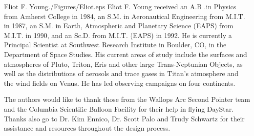 \documentclass[twocolumn,letterpaper]{IEEEAerospace2012}
\newcommand{\rootdir}{./Figures/}
\begin{document}
\begin{biographywithpic}{Eliot F. Young}{\rootdir Eliot.eps}
Eliot F. Young received an A.B .in Physics from Amherst College in 1984, an S.M. in Aeronautical Engineering from M.I.T. in 1987, an S.M. in Earth, Atmospheric and Planetary Science (EAPS) from M.I.T. in 1990, and an Sc.D. from M.I.T. (EAPS) in 1992. He is currently a Principal Scientist at Southwest Research Institute in Boulder, CO, in the Department of Space Studies. His current areas of study include the surfaces and atmospheres of Pluto, Triton, Eris and other large Trans-Neptunian Objects, as well as the distributions of aerosols and trace gases in Titan's atmosphere and the wind fields on Venus. He has led observing campaigns on four continents.
\end{biographywithpic}

\acknowledgments
The authors would like to thank those from the Wallops Arc Second Pointer team and the Columbia Scientific Balloon Facility for their help in flying DayStar. Thanks also go to Dr. Kim Ennico, Dr. Scott Palo and Trudy Schwartz for their assistance and resources throughout the design process.
\end{document}

